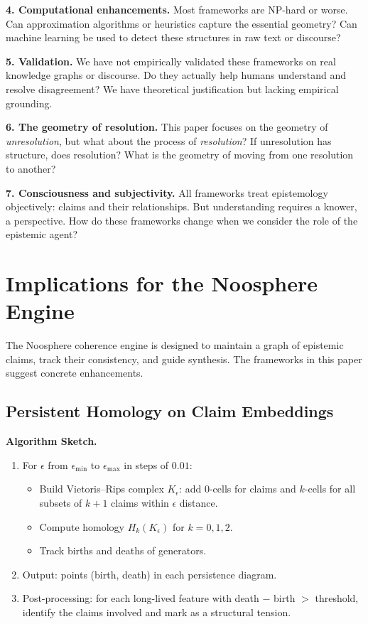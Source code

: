 \documentclass[11pt,letterpaper]{article}
\theoremstyle{definition}
\theoremstyle{remark}
\begin{document}
\textbf{4. Computational enhancements.} Most frameworks are NP-hard or worse. Can approximation algorithms or heuristics capture the essential geometry? Can machine learning be used to detect these structures in raw text or discourse?

\textbf{5. Validation.} We have not empirically validated these frameworks on real knowledge graphs or discourse. Do they actually help humans understand and resolve disagreement? We have theoretical justification but lacking empirical grounding.

\textbf{6. The geometry of resolution.} This paper focuses on the geometry of \emph{unresolution}, but what about the process of \emph{resolution}? If unresolution has structure, does resolution? What is the geometry of moving from one resolution to another?

\textbf{7. Consciousness and subjectivity.} All frameworks treat epistemology objectively: claims and their relationships. But understanding requires a knower, a perspective. How do these frameworks change when we consider the role of the epistemic agent?

\newpage

\section{Implications for the Noosphere Engine}
\label{sec:noosphere}

The Noosphere coherence engine is designed to maintain a graph of epistemic claims, track their consistency, and guide synthesis. The frameworks in this paper suggest concrete enhancements.

\subsection{Persistent Homology on Claim Embeddings}

\textbf{Algorithm Sketch.}

\begin{enumerate}
\item For $\epsilon$ from $\epsilon_{\min}$ to $\epsilon_{\max}$ in steps of $0.01$:
   \begin{itemize}
   \item Build Vietoris--Rips complex $K_\epsilon$: add 0-cells for claims and $k$-cells for all subsets of $k+1$ claims within $\epsilon$ distance.
   \item Compute homology $H_k(K_\epsilon)$ for $k = 0, 1, 2$.
   \item Track births and deaths of generators.
   \end{itemize}
\item Output: points (birth, death) in each persistence diagram.
\item Post-processing: for each long-lived feature with death $-$ birth $> $ threshold, identify the claims involved and mark as a structural tension.
\end{enumerate}
\end{document}
